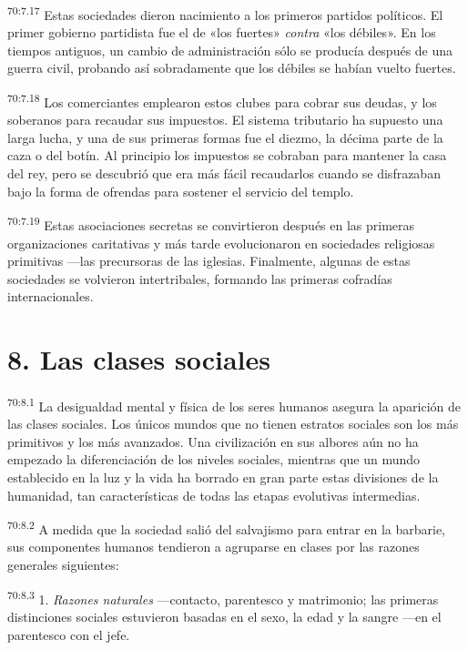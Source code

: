 \par
\textsuperscript{70:7.17} Estas sociedades dieron nacimiento a los primeros partidos políticos. El primer gobierno partidista fue el de «los fuertes» \textit{contra} «los débiles». En los tiempos antiguos, un cambio de administración sólo se producía después de una guerra civil, probando así sobradamente que los débiles se habían vuelto fuertes.

\par
\textsuperscript{70:7.18} Los comerciantes emplearon estos clubes para cobrar sus deudas, y los soberanos para recaudar sus impuestos. El sistema tributario ha supuesto una larga lucha, y una de sus primeras formas fue el diezmo, la décima parte de la caza o del botín. Al principio los impuestos se cobraban para mantener la casa del rey, pero se descubrió que era más fácil recaudarlos cuando se disfrazaban bajo la forma de ofrendas para sostener el servicio del templo.

\par
\textsuperscript{70:7.19} Estas asociaciones secretas se convirtieron después en las primeras organizaciones caritativas y más tarde evolucionaron en sociedades religiosas primitivas ---las precursoras de las iglesias. Finalmente, algunas de estas sociedades se volvieron intertribales, formando las primeras cofradías internacionales.

\section*{8. Las clases sociales}
\par
\textsuperscript{70:8.1} La desigualdad mental y física de los seres humanos asegura la aparición de las clases sociales. Los únicos mundos que no tienen estratos sociales son los más primitivos y los más avanzados. Una civilización en sus albores aún no ha empezado la diferenciación de los niveles sociales, mientras que un mundo establecido en la luz y la vida ha borrado en gran parte estas divisiones de la humanidad, tan características de todas las etapas evolutivas intermedias.

\par
\textsuperscript{70:8.2} A medida que la sociedad salió del salvajismo para entrar en la barbarie, sus componentes humanos tendieron a agruparse en clases por las razones generales siguientes:

\par
\textsuperscript{70:8.3} 1. \textit{Razones naturales} ---contacto, parentesco y matrimonio; las primeras distinciones sociales estuvieron basadas en el sexo, la edad y la sangre ---en el parentesco con el jefe.

